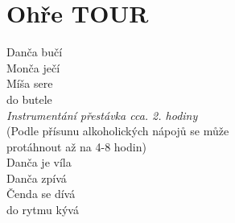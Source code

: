\section{Ohře TOUR}
\onehalfspacing

Danča bučí\\
Monča ječí\\
Míša sere\\
do butele\\

\textit{Instrumentání přestávka cca. 2. hodiny}\\
(Podle přísunu alkoholických nápojů se může \\
protáhnout až na 4-8 hodin)\\

Danča je víla\\
Danča zpívá\\
Čenda se dívá\\
do rytmu kývá\\

